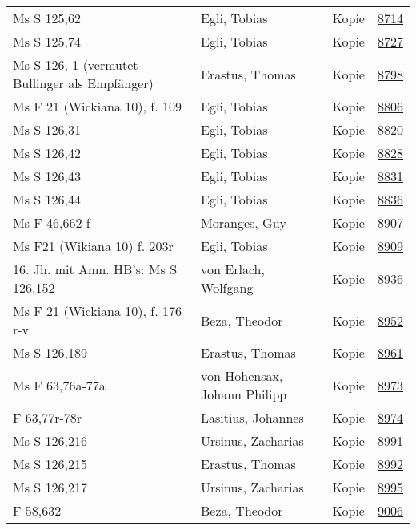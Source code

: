 \documentclass[10pt,a4paper,landscape]{report}
\begin{document}
\begin{longtable}{p{16cm}p{4cm}lr}
Ms S 125,62	&	Egli, Tobias	&	Kopie	&	\href{http://130.60.24.72/assignment/8714}{8714}\\
Ms S 125,74	&	Egli, Tobias	&	Kopie	&	\href{http://130.60.24.72/assignment/8727}{8727}\\
Ms S 126, 1 (vermutet Bullinger als Empfänger)	&	Erastus, Thomas	&	Kopie	&	\href{http://130.60.24.72/assignment/8798}{8798}\\
Ms F 21 (Wickiana 10), f. 109	&	Egli, Tobias	&	Kopie	&	\href{http://130.60.24.72/assignment/8806}{8806}\\
Ms S 126,31	&	Egli, Tobias	&	Kopie	&	\href{http://130.60.24.72/assignment/8820}{8820}\\
Ms S 126,42	&	Egli, Tobias	&	Kopie	&	\href{http://130.60.24.72/assignment/8828}{8828}\\
Ms S 126,43	&	Egli, Tobias	&	Kopie	&	\href{http://130.60.24.72/assignment/8831}{8831}\\
Ms S 126,44	&	Egli, Tobias	&	Kopie	&	\href{http://130.60.24.72/assignment/8836}{8836}\\
Ms F 46,662 f	&	Moranges, Guy	&	Kopie	&	\href{http://130.60.24.72/assignment/8907}{8907}\\
Ms F21 (Wikiana 10) f. 203r	&	Egli, Tobias	&	Kopie	&	\href{http://130.60.24.72/assignment/8909}{8909}\\
16. Jh. mit Anm. HB's: Ms S 126,152	&	von Erlach, Wolfgang	&	Kopie	&	\href{http://130.60.24.72/assignment/8936}{8936}\\
Ms F 21 (Wickiana 10), f. 176 r-v	&	Beza, Theodor	&	Kopie	&	\href{http://130.60.24.72/assignment/8952}{8952}\\
Ms S 126,189	&	Erastus, Thomas	&	Kopie	&	\href{http://130.60.24.72/assignment/8961}{8961}\\
Ms F 63,76a-77a	&	von Hohensax, Johann Philipp	&	Kopie	&	\href{http://130.60.24.72/assignment/8973}{8973}\\
F 63,77r-78r	&	Lasitius, Johannes	&	Kopie	&	\href{http://130.60.24.72/assignment/8974}{8974}\\
Ms S 126,216	&	Ursinus, Zacharias	&	Kopie	&	\href{http://130.60.24.72/assignment/8991}{8991}\\
Ms S 126,215	&	Erastus, Thomas	&	Kopie	&	\href{http://130.60.24.72/assignment/8992}{8992}\\
Ms S 126,217	&	Ursinus, Zacharias	&	Kopie	&	\href{http://130.60.24.72/assignment/8995}{8995}\\
F 58,632	&	Beza, Theodor	&	Kopie	&	\href{http://130.60.24.72/assignment/9006}{9006}\\

\end{longtable}
\end{document}

